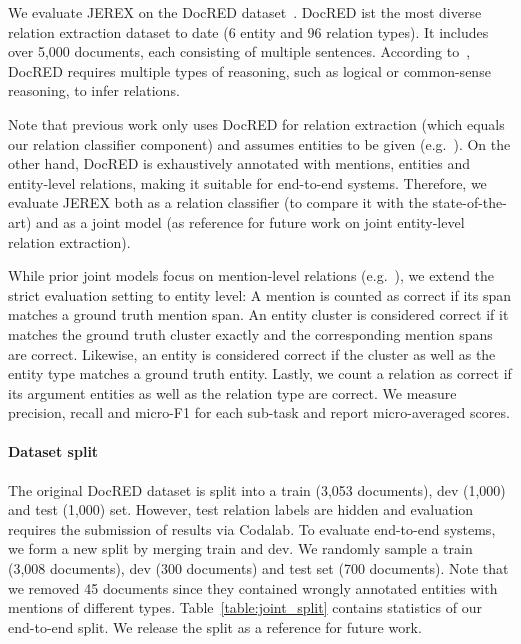 \documentclass[11pt,a4paper]{article}
\newcommand\name{JEREX}
\begin{document}
We evaluate \name{} on the DocRED dataset~\cite{yao:2019:docred}. DocRED ist the most diverse relation extraction dataset to date (6 entity and 96 relation types). It includes over 5,000 documents, each consisting of multiple sentences. According to~\citet{yao:2019:docred}, DocRED requires multiple types of reasoning, such as logical or common-sense reasoning, to infer relations. 

Note that previous work only uses DocRED for relation extraction (which equals our relation classifier component) and assumes entities to be given (e.g.~\citealt{wang:2019:two-step-bert, nan:2020:bert_lsr}). On the other hand, DocRED is exhaustively annotated with mentions, entities and entity-level relations, making it suitable for end-to-end systems. 
Therefore, we evaluate \name{} both as a relation classifier (to compare it with the state-of-the-art) and as a joint model (as reference for future work on joint entity-level relation extraction).  

While prior joint models focus on mention-level relations (e.g.~\citealt{gupta:2016:table_filling, bekoulis:2018:multi_head, chi:2019:hierarch_attention}), we extend the strict evaluation setting to entity level: A mention is counted as correct if its span matches a ground truth mention span. An entity cluster is considered correct if it matches the ground truth cluster exactly and the corresponding mention spans are correct. Likewise, an entity is considered correct if the cluster as well as the entity type matches a ground truth entity. Lastly, we count a relation as correct if its argument entities as well as the relation type are correct. We measure precision, recall and micro-F1 for each sub-task and report micro-averaged scores.

\paragraph{Dataset split} The original DocRED dataset is split into a train (3,053 documents), dev (1,000) and test (1,000) set. However, test relation labels are hidden and evaluation requires the submission of results via Codalab. To evaluate end-to-end systems, we form a new split by merging train and dev. We randomly sample a train (3,008 documents), dev (300 documents) and test set (700 documents). Note that we removed 45 documents since they contained wrongly annotated entities with mentions of different types. Table~\ref{table:joint_split} contains statistics of our end-to-end split. We release the split as a reference for future work.
\end{document}
